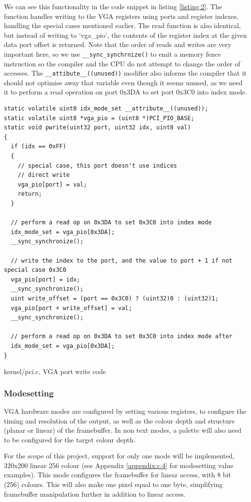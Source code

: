 We can see this functionality in the code snippet in listing \ref{listing:2}. The function
handles writing to the VGA registers using ports and register indexes, handling the special cases
mentioned earlier. The read function is also identical, but instead of writing to 
`vga\_pio', the contents of the register index at the given data port offset is returned. Note
that the order of reads and writes are very important here, so we use \texttt{__sync_synchrnize()}
to emit a memory fence instruction so the compiler and the CPU do not attempt to change the order
of accesses. The \texttt{__attibute__((unused))} modifier also informs the compiler that
it should not optimise away that variable even though it seems unused, as we need it to perform
a read operation on port 0x3DA to set port 0x3C0 into index mode.

\begin{listing}[H]
    \begin{verbatim}
static volatile uint8 idx_mode_set __attribute__((unused));
static volatile uint8 *vga_pio = (uint8 *)PCI_PIO_BASE;
static void pwrite(uint32 port, uint32 idx, uint8 val)
{
  if (idx == 0xFF)
  {
    // special case, this port doesn't use indices
    // direct write
    vga_pio[port] = val;
    return;
  }

  // perform a read op on 0x3DA to set 0x3C0 into index mode
  idx_mode_set = vga_pio[0x3DA];
  __sync_synchronize();

  // write the index to the port, and the value to port + 1 if not special case 0x3C0
  vga_pio[port] = idx;
  __sync_synchronize();
  uint write_offset = (port == 0x3C0) ? (uint32)0 : (uint32)1;
  vga_pio[port + write_offset] = val;
  __sync_synchronize();

  // perform a read op on 0x3DA to set 0x3C0 into index mode after
  idx_mode_set = vga_pio[0x3DA];
}
    \end{verbatim}
    \caption{kernel/pci.c, VGA port write code}
    \label{listing:2}
\end{listing}
\subsubsection{Modesetting}
VGA hardware modes are configured by setting various registers, to configure the timing and resolution
of the output, as well as the colour depth and structure (planar or linear) of the framebuffer.
In non text modes, a palette will also need to be configured for the target colour depth.

For the scope of this project, support for only one mode will be implemented, 320x200 linear 256 colour 
(see Appendix \ref{appendix:c:4} for modesetting value examples).
This mode configures the framebuffer for linear access, with 8 bit (256) colours. This will
also make one pixel equal to one byte, simplifying framebuffer manipulation further in addition to linear access.

